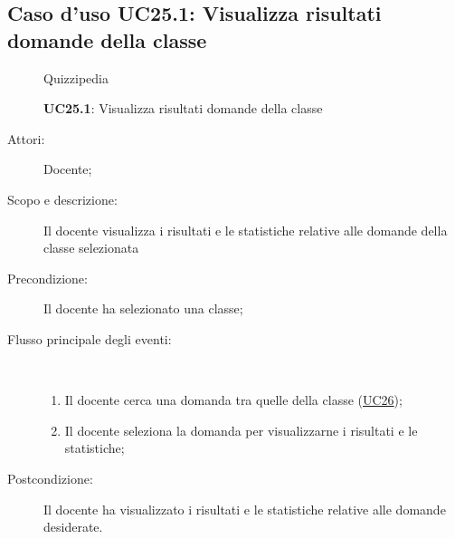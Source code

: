 \subsection{Caso d'uso UC25.1: Visualizza risultati domande della classe}
	\begin{figure}[H]
		\centering
		\begin{resizedtikzpicture}{\textwidth}
		\begin{umlsystem}[x=0, fill=lightgray!20]{Quizzipedia}
		\end{umlsystem}
		\end{resizedtikzpicture}
		\caption{\textbf{UC25.1}: Visualizza risultati domande della classe}
		\label{UC25.1}
	\end{figure}
\begin{description}
\item[Attori:] Docente;
\item[Scopo e descrizione:] Il docente visualizza i risultati e le statistiche relative alle domande della classe selezionata
      \item[Precondizione:] Il docente ha selezionato una classe;

        \item[Flusso principale degli eventi:] \ 
 \begin{enumerate}
          \item Il docente cerca una domanda tra quelle della classe (\hyperlink{UC26}{UC26});
          \item Il docente seleziona la domanda per visualizzarne i risultati e le statistiche;

      \end{enumerate}
    \item[Postcondizione:] Il docente ha visualizzato i risultati e le statistiche relative alle domande desiderate.
  \end{description}
\hypertarget{UC25.2}{}
